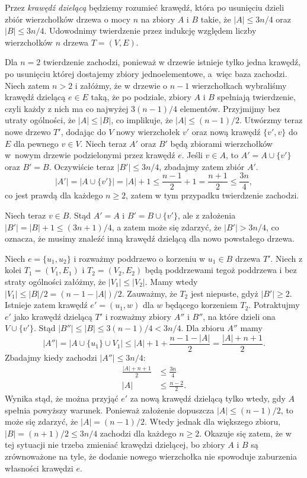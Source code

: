 
\subproblem %
Przez \emph{krawędź dzielącą} będziemy rozumieć krawędź, która po usunięciu dzieli zbiór wierzchołków drzewa o mocy $n$ na zbiory $A$ i $B$ takie, że $|A|\le3n/4$ oraz $|B|\le3n/4$. Udowodnimy twierdzenie przez indukcję względem liczby wierzchołków $n$ drzewa $T=(V,E)$.

Dla $n=2$ twierdzenie zachodzi, ponieważ w drzewie istnieje tylko jedna krawędź, po usunięciu której dostajemy zbiory jednoelementowe, a~więc baza zachodzi. Niech zatem $n>2$ i załóżmy, że w drzewie o $n-1$ wierzchołkach wybraliśmy krawędź dzielącą $e\in E$ taką, że po podziale, zbiory $A$ i $B$ spełniają twierdzenie, czyli każdy z nich ma co najwyżej $3(n-1)/4$ elementów. Przyjmijmy bez utraty ogólności, że $|A|\le|B|$, co implikuje, że $|A|\le(n-1)/2$. Utwórzmy teraz nowe drzewo $T'$, dodając do $V$ nowy wierzchołek $v'$ oraz nową krawędź $\{v',v\}$ do $E$ dla pewnego $v\in V$. Niech teraz $A'$ oraz $B'$ będą zbiorami wierzchołków w~nowym drzewie podzielonymi przez krawędź $e$. Jeśli $v\in A$, to $A'=A\cup\{v'\}$ oraz $B'=B$. Oczywiście teraz $|B'|\le3n/4$, zbadajmy zatem zbiór $A'$.
\[
	|A'| = \bigl|A\cup\{v'\}\bigr| = |A|+1 \le \frac{n-1}{2}+1 = \frac{n+1}{2} \le \frac{3n}{4},
\]
co jest prawdą dla każdego $n\ge2$, zatem w tym przypadku twierdzenie zachodzi.

Niech teraz $v\in B$. Stąd $A'=A$ i $B'=B\cup \{v'\}$, ale z założenia $|B'|=|B|+1\le(3n+1)/4$, a zatem może się zdarzyć, że $|B'|>3n/4$, co oznacza, że musimy znaleźć inną krawędź dzielącą dla nowo powstałego drzewa.

Niech $e=\{u_1,u_2\}$ i rozważmy poddrzewo o korzeniu w $u_1\in B$ drzewa $T'$. Niech z kolei $T_1=(V_1,E_1)$ i $T_2=(V_2,E_2)$ będą poddrzewami tegoż poddrzewa i bez straty ogólności załóżmy, że $|V_1|\le|V_2|$. Mamy wtedy $|V_1|\le|B|/2=(n-1-|A|)/2$. Zauważmy, że $T_2$ jest niepuste, gdyż $|B'|\ge2$. Istnieje zatem krawędź $e'=(u_1,w)$ dla $w$ będącego korzeniem $T_2$. Potraktujmy $e'$ jako krawędź dzielącą $T'$ i rozważmy zbiory $A''$ i $B''$, na które dzieli ona $V\cup\{v'\}$. Stąd $|B''|\le|B|\le3(n-1)/4<3n/4$. Dla zbioru $A''$ mamy
\[
	|A''| = \bigl|A\cup\{u_1\}\cup V_1\bigr| \le |A|+1+\frac{n-1-|A|}{2} = \frac{|A|+n+1}{2}.
\]
Zbadajmy kiedy zachodzi $|A''|\le3n/4$:
\begin{align*}
	\frac{|A|+n+1}{2} &\le \frac{3n}{4} \\
	|A| &\le \frac{n-2}{2}.
\end{align*}
Wynika stąd, że można przyjąć $e'$ za nową krawędź dzielącą tylko wtedy, gdy $A$ spełnia powyższy warunek. Ponieważ założenie dopuszcza $|A|\le(n-1)/2$, to może się zdarzyć, że $|A|=(n-1)/2$. Wtedy jednak dla większego zbioru, $|B|=(n+1)/2\le3n/4$ zachodzi dla każdego $n\ge2$. Okazuje się zatem, że w tej sytuacji nie trzeba zmieniać krawędzi dzielącej, bo zbiory $A$ i $B$ są zrównoważone na tyle, że dodanie nowego wierzchołka nie spowoduje zaburzenia własności krawędzi $e$. 

